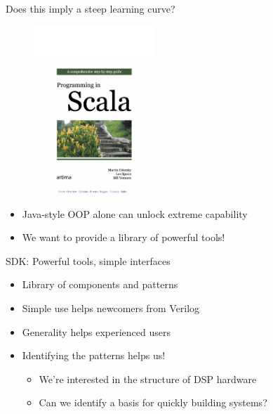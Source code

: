 \documentclass{beamer}
\begin{document}
\begin{frame}{Does this imply a steep learning curve?}
  \begin{figure}
    \centering
    \includegraphics[width=0.4\textwidth]{images/programming-in-scala.pdf}
  \end{figure}
  \begin{itemize}
    \item Java-style OOP alone can unlock extreme capability
    \item<2-> We want to provide a library of powerful tools!
  \end{itemize}
\end{frame}

\begin{frame}{SDK: Powerful tools, simple interfaces}
  \begin{itemize}
  \item Library of components and patterns
  \item Simple use helps newcomers from Verilog
  \item Generality helps experienced users
  \item<2-> Identifying the patterns helps us!
    \begin{itemize}
    \item We're interested in the structure of DSP hardware
    \item Can we identify a basis for quickly building systems?
    \end{itemize}
  \end{itemize}
\end{frame}
\end{document}
